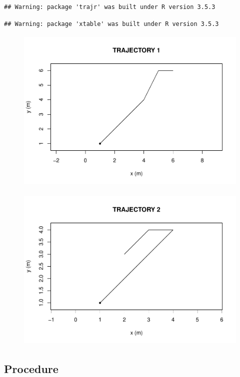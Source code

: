 \documentclass[man]{apa6}
\begin{document}
\begin{verbatim}
## Warning: package 'trajr' was built under R version 3.5.3
\end{verbatim}

\begin{verbatim}
## Warning: package 'xtable' was built under R version 3.5.3
\end{verbatim}

\begin{figure}
\includegraphics[height=300px]{final_paper_files/figure-latex/unnamed-chunk-1-1} \caption{ }\label{fig:unnamed-chunk-1}
\end{figure}

\begin{figure}
\includegraphics[height=300px]{final_paper_files/figure-latex/unnamed-chunk-2-1} \caption{ }\label{fig:unnamed-chunk-2}
\end{figure}

\subsection{Procedure}\label{procedure}
\end{document}
